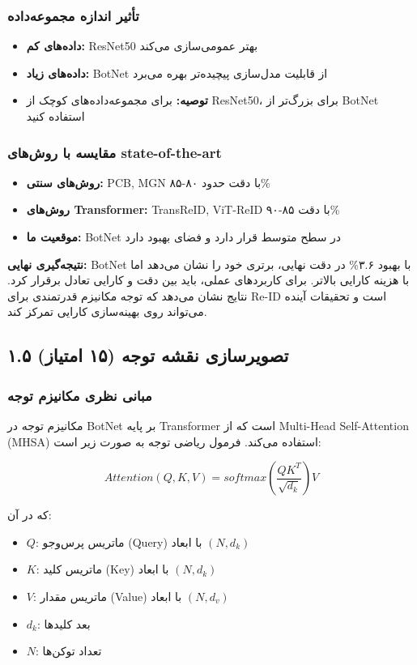 \documentclass[12pt,a4paper]{article}
\theoremstyle{definition}
\begin{document}
\subsubsection*{تأثیر اندازه مجموعه‌داده}
\begin{itemize}
    \item \textbf{داده‌های کم:} ResNet50 بهتر عمومی‌سازی می‌کند
    \item \textbf{داده‌های زیاد:} BotNet از قابلیت مدل‌سازی پیچیده‌تر بهره می‌برد
    \item \textbf{توصیه:} برای مجموعه‌داده‌های کوچک از ResNet50، برای بزرگ‌تر از BotNet استفاده کنید
\end{itemize}

\subsubsection*{مقایسه با روش‌های state-of-the-art}
\begin{itemize}
    \item \textbf{روش‌های سنتی:} PCB, MGN با دقت حدود ۸۰-۸۵\%
    \item \textbf{روش‌های Transformer:} TransReID, ViT-ReID با دقت ۸۵-۹۰\%
    \item \textbf{موقعیت ما:} BotNet در سطح متوسط قرار دارد و فضای بهبود دارد
\end{itemize}

\textbf{نتیجه‌گیری نهایی:}
BotNet با بهبود ۳.۶\% در دقت نهایی، برتری خود را نشان می‌دهد اما با هزینه کارایی بالاتر. برای کاربردهای عملی، باید بین دقت و کارایی تعادل برقرار کرد. نتایج نشان می‌دهد که توجه مکانیزم قدرتمندی برای Re-ID است و تحقیقات آینده می‌تواند روی بهینه‌سازی کارایی تمرکز کند.

\subsection{۱.۵ تصویرسازی نقشه توجه (۱۵ امتیاز)}

\subsubsection*{مبانی نظری مکانیزم توجه}
مکانیزم توجه در BotNet بر پایه Transformer است که از Multi-Head Self-Attention (MHSA) استفاده می‌کند. فرمول ریاضی توجه به صورت زیر است:

\begin{equation}
Attention(Q, K, V) = softmax\left(\frac{QK^T}{\sqrt{d_k}}\right)V
\end{equation}

که در آن:
\begin{itemize}
    \item $Q$: ماتریس پرس‌وجو (Query) با ابعاد $(N, d_k)$
    \item $K$: ماتریس کلید (Key) با ابعاد $(N, d_k)$
    \item $V$: ماتریس مقدار (Value) با ابعاد $(N, d_v)$
    \item $d_k$: بعد کلیدها
    \item $N$: تعداد توکن‌ها
\end{itemize}
\end{document}
